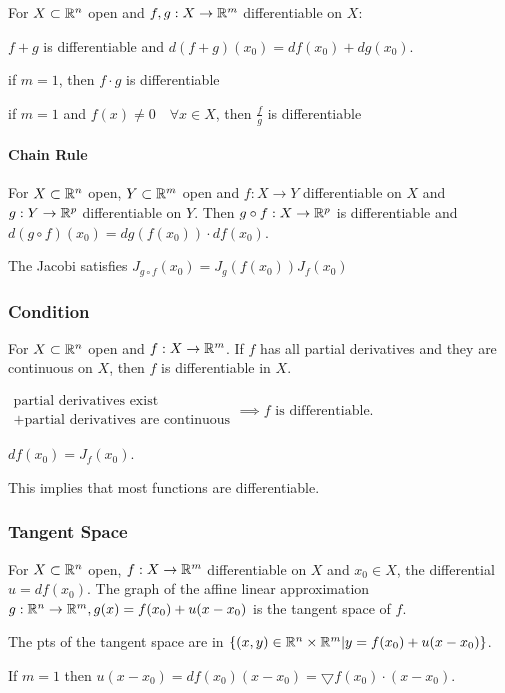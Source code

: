For $X \subset \mathbb{R}^n$ open and $f, g: X \to \mathbb{R}^m$ differentiable on $X$:
\begin{compactitem}
    \item $f + g$ is differentiable and $d(f + g)(x_0) = df(x_0) + dg(x_0)$.
    \item if $m = 1$, then $f \cdot g$ is differentiable
    \item if $m = 1$ and $f(x) \neq 0 \quad \forall x \in X$, then $\frac{f}{g}$ is differentiable
\end{compactitem}

\paragraph{Chain Rule}
For $X \subset \mathbb{R}^n$ open, $Y \subset \mathbb{R}^m$ open and $f: X \to Y$ differentiable on $X$ and $g: Y \to \mathbb{R}^p$ differentiable on $Y$. Then $g \circ f: X \to \mathbb{R}^p$ is differentiable and $d(g \circ f)(x_0) = dg(f(x_0)) \cdot df(x_0)$.

\begin{compactitem}
    \item The Jacobi satisfies $J_{g \circ f}(x_0) = J_g(f(x_0))J_f(x_0)$
\end{compactitem}

\subsubsection{Condition}
For $X \subset \mathbb{R}^n$ open and $f: X \to \mathbb{R}^m$. If $f$ has all partial derivatives and they are continuous on $X$, then $f$ is differentiable in $X$.

\begin{compactitem}
    \item $\substack{\text{partial derivatives exist}\\ + \text{partial derivatives are continuous}} \implies f \text{ is differentiable}$.
    \item $df(x_0) = J_f(x_0)$.
    \item This implies that most functions are differentiable.
\end{compactitem}

\subsubsection{Tangent Space}
For $X \subset \mathbb{R}^n$ open, $f: X \to \mathbb{R}^m$ differentiable on $X$ and $x_0 \in X$, the differential $u = df(x_0)$. The graph of the affine linear approximation $g: \mathbb{R}^n \to \mathbb{R}^m, g(x) = f(x_0) + u(x - x_0)$ is the tangent space of $f$.
\begin{compactitem}
    \item The pts of the tangent space are in $\{(x, y) \in \mathbb{R}^n \times \mathbb{R}^m | y = f(x_0) + u(x - x_0) \}$.
    \item If $m = 1$ then $u(x - x_0) = df(x_0)(x - x_0) = \bigtriangledown f(x_0) \cdot (x - x_0)$.
\end{compactitem}

